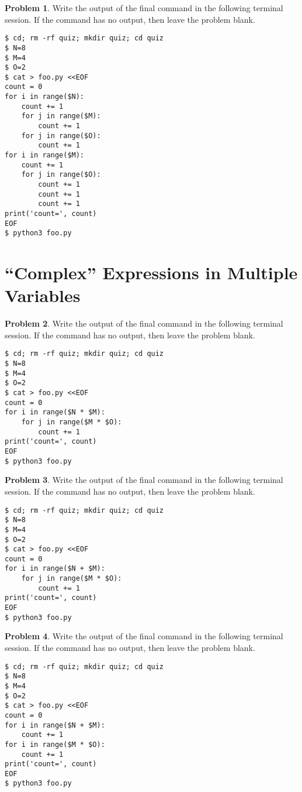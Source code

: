 \documentclass[10pt]{article}
\theoremstyle{definition}
\newtheorem{problem}{Problem}
\begin{document}
\filbreak
\begin{problem}
    Write the output of the final command in the following terminal session.
    If the command has no output, then leave the problem blank.
\end{problem}
\begin{lstlisting}
$ cd; rm -rf quiz; mkdir quiz; cd quiz
$ N=8
$ M=4
$ O=2
$ cat > foo.py <<EOF
count = 0
for i in range($N):
    count += 1
    for j in range($M):
        count += 1
    for j in range($O):
        count += 1
for i in range($M):
    count += 1
    for j in range($O):
        count += 1
        count += 1
        count += 1
print('count=', count)
EOF
$ python3 foo.py
\end{lstlisting}
\vspace{0.4in}

\filbreak
\section{``Complex'' Expressions in Multiple Variables}

\begin{problem}
    Write the output of the final command in the following terminal session.
    If the command has no output, then leave the problem blank.
\end{problem}
\begin{lstlisting}
$ cd; rm -rf quiz; mkdir quiz; cd quiz
$ N=8
$ M=4
$ O=2
$ cat > foo.py <<EOF
count = 0
for i in range($N * $M):
    for j in range($M * $O):
        count += 1
print('count=', count)
EOF
$ python3 foo.py
\end{lstlisting}
\vspace{0.4in}

\filbreak
\begin{problem}
    Write the output of the final command in the following terminal session.
    If the command has no output, then leave the problem blank.
\end{problem}
\begin{lstlisting}
$ cd; rm -rf quiz; mkdir quiz; cd quiz
$ N=8
$ M=4
$ O=2
$ cat > foo.py <<EOF
count = 0
for i in range($N + $M):
    for j in range($M * $O):
        count += 1
print('count=', count)
EOF
$ python3 foo.py
\end{lstlisting}
\vspace{0.4in}

\filbreak
\begin{problem}
    Write the output of the final command in the following terminal session.
    If the command has no output, then leave the problem blank.
\end{problem}
\begin{lstlisting}
$ cd; rm -rf quiz; mkdir quiz; cd quiz
$ N=8
$ M=4
$ O=2
$ cat > foo.py <<EOF
count = 0
for i in range($N + $M):
    count += 1
for i in range($M * $O):
    count += 1
print('count=', count)
EOF
$ python3 foo.py
\end{lstlisting}
\vspace{0.4in}
\end{document}
